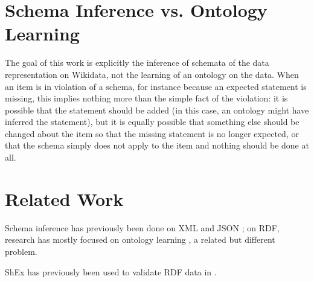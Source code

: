 \documentclass{scrartcl}
\begin{document}
\section{Schema Inference vs. Ontology Learning}

The goal of this work is explicitly the inference of schemata of the data representation on Wikidata,
not the learning of an ontology on the data.
When an item is in violation of a schema,
for instance because an expected statement is missing,
this implies nothing more than the simple fact of the violation:
it is possible that the statement should be added
(in this case, an ontology might have inferred the statement),
but it is equally possible that something else should be changed about the item so that the missing statement is no longer expected,
or that the schema simply does not apply to the item and nothing should be done at all.

\section{Related Work}

Schema inference has previously been done on XML \cite{Bex:2007:IXS:1325851.1325964} and JSON \cite{json-inference};
on RDF, research has mostly focused on ontology learning \cite{Zhou2007}, a related but different problem.

ShEx has previously been used to validate RDF data in \cite{SOLBRIG201790}.



\end{document}
